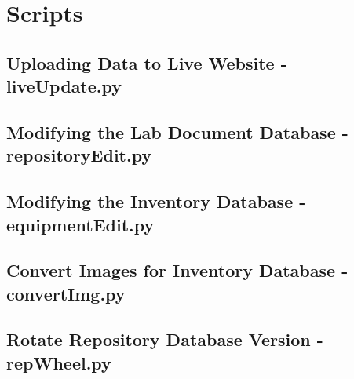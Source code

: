 \documentclass[justified]{pjlProcessDocs}
\begin{document}
\section{Scripts}

\subsection{Uploading Data to Live Website - liveUpdate.py}



\clearpage
\subsection{Modifying the Lab Document Database - repositoryEdit.py}



\clearpage
\subsection{Modifying the Inventory Database - equipmentEdit.py}



\subsection{Convert Images for Inventory Database - convertImg.py}




\subsection{Rotate Repository Database Version - repWheel.py}


\end{document}
